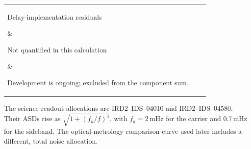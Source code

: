 \begin{table}[t]
\begin{tabular}{lll}
\parbox[t]{0.24\textwidth}{\raggedright Delay-implementation residuals\par\vspace{3pt}} & \parbox[t]{0.28\textwidth}{\raggedright Not quantified in this calculation\par\vspace{3pt}} & \parbox[t]{0.41\textwidth}{\raggedright Development is ongoing; excluded from the component sum.\par\vspace{3pt}} \\[5pt]
\hline
\end{tabular}
\end{table}

The science-readout allocations are IRD2--IDS--04010 and IRD2--IDS--04580. Their ASDs rise as $\sqrt{1+(f_k/f)^4}$, with $f_k=2\,\mathrm{mHz}$ for the carrier and $0.7\,\mathrm{mHz}$ for the sideband. The optical-metrology comparison curve used later includes a different, total noise allocation.
